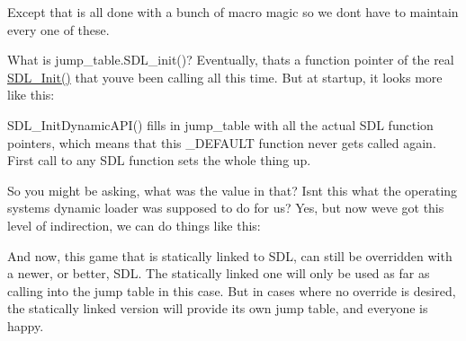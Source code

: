 \begin{DoxyCode}{0}
\DoxyCodeLine{\{}
\DoxyCodeLine{\}}

\end{DoxyCode}


Except that is all done with a bunch of macro magic so we don\textquotesingle{}t have to maintain every one of these.

What is jump\+\_\+table.\+SDL\+\_\+init()? Eventually, that\textquotesingle{}s a function pointer of the real \mbox{\hyperlink{_s_d_l_8h_a8fc8d35348d7c74bad8392d776c937b8}{SDL\+\_\+\+Init()}} that you\textquotesingle{}ve been calling all this time. But at startup, it looks more like this\+:


\begin{DoxyCode}{0}
\DoxyCodeLine{\{}
\DoxyCodeLine{\}}

\end{DoxyCode}


SDL\+\_\+\+Init\+Dynamic\+API() fills in jump\+\_\+table with all the actual SDL function pointers, which means that this {\ttfamily \+\_\+\+DEFAULT} function never gets called again. First call to any SDL function sets the whole thing up.

So you might be asking, what was the value in that? Isn\textquotesingle{}t this what the operating system\textquotesingle{}s dynamic loader was supposed to do for us? Yes, but now we\textquotesingle{}ve got this level of indirection, we can do things like this\+:


\begin{DoxyCode}{0}

\end{DoxyCode}


And now, this game that is statically linked to SDL, can still be overridden with a newer, or better, SDL. The statically linked one will only be used as far as calling into the jump table in this case. But in cases where no override is desired, the statically linked version will provide its own jump table, and everyone is happy.

